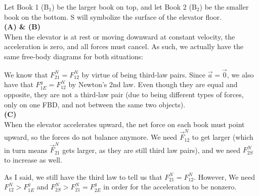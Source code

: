\documentclass[]{article}
\begin{document}
\begin{TeacherMargin}
\noindent Let Book 1 (B$_{1}$) be the larger book on top, and let Book 2 (B$_{2}$) be the smaller book on the bottom. S will symbolize the surface of the elevator floor. \\
\textbf{(A) \& (B)} \\
When the elevator is at rest or moving downward at constant velocity, the acceleration is zero, and all forces must cancel. As such, we actually have the same free-body diagrams for both situations:
\begin{center}
\end{center}
We know that $F^{N}_{21} = F^{N}_{12}$ by virtue of being third-law pairs. Since $\vec{a}=\vec{0}$, we also have that $F^{g}_{1E} = F^{N}_{12}$ by Newton's 2nd law. Even though they are equal and opposite, they are not a third-law pair (due to being different types of forces, only on one FBD, and not between the same two objects). \\
\textbf{(C)} \\
When the elevator accelerates upward, the net force on each book must point upward, so the forces do not balance anymore. We need $\vec{F}^{N}_{12}$ to get larger (which in turn means $\vec{F}^{N}_{21}$ gets larger, as they are still third law pairs), and we need $F^{N}_{2S}$ to increase as well.
\begin{center}
\end{center}
As I said, we still have the third law to tell us that $F^{N}_{21} = F^{N}_{12}$. However, We need $F^{N}_{12} > F^{g}_{1E}$ and $F^{N}_{2S}>F^{N}_{21}=F^{g}_{2E}$ in order for the acceleration to be nonzero.
\end{TeacherMargin}
\end{document}
